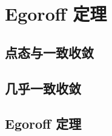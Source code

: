 \section{Egoroff 定理}
\label{b1:sec:0405}


\subsection{点态与一致收敛}
\label{b1:subsec:040501}

\subsection{几乎一致收敛}
\label{b1:subsec:040502}

\subsection{Egoroff 定理}
\label{b1:subsec:040503}


